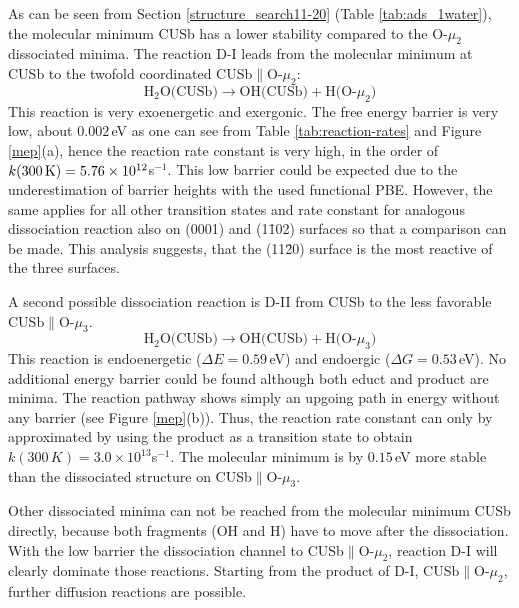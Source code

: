\documentclass[11pt,DIV=13,BCOR=5mm,a4paper,headinclude]{scrbook}
\newcommand\todo[1]{\textcolor{red}{TODO: \textit{{#1}}}}
\begin{document}
As can be seen from Section \ref{structure_search11-20} (Table \ref{tab:ads_1water}), the molecular minimum CUSb has a lower stability compared to the O-$\mu_2$ dissociated minima.
The reaction D-I leads from the molecular minimum at CUSb to the twofold coordinated CUSb$\parallel$O-$\mu_2$:
 \begin{equation}
 \text{H$_2$O(CUSb)} \rightarrow \text{OH(CUSb)} + \text{H(O-$\mu_2$)} \tag{D-I}
      \label{dissI}
\end{equation}
This reaction is very exoenergetic and exergonic.
The free energy barrier is very low, about $0.002\,$eV as one can see from Table \ref{tab:reaction-rates} and Figure \ref{mep}(a), hence the reaction rate constant is very high, in the order of $k(\textrm{300\,K})=5.76\times 10^{12}$s$^{-1}$.
This low barrier could be expected due to the underestimation of barrier heights\cite{Zhao05} with the used functional PBE. %
However, the same applies for all other transition states and rate constant for analogous dissociation reaction also on (0001) and (1\=102) surfaces so that a comparison can be made.
This analysis suggests, that the (11\=20) surface is the most reactive of the three surfaces\cite{WirthJPCC2012,Wirth2016}. %



A second possible dissociation reaction is D-II from CUSb to the less favorable CUSb$\parallel$O-$\mu_3$.
\begin{equation}
  \text{H$_2$O(CUSb)} \rightarrow \text{OH(CUSb)} + \text{H(O-$\mu_3$)} \tag{D-II}
      \label{dissII}
\end{equation}
This reaction is endoenergetic ($\Delta E=0.59\,$eV) and endoergic ($\Delta G=0.53\,$eV).
No additional energy barrier could be found although both educt and product are minima.
The reaction pathway shows simply an upgoing path in energy without any barrier (see Figure \ref{mep}(b)).
Thus, the reaction rate constant can only by approximated by using the product as a transition state to obtain $k(300\,K)=3.0\times 10^{13}$s$^{-1}$.
The molecular minimum is by $0.15\,$eV more stable than the dissociated structure on CUSb$\parallel$O-$\mu_3$.

Other dissociated minima can not be reached from the molecular minimum CUSb directly, because both fragments (OH and H) have to move after the dissociation.
With the low barrier the dissociation channel to CUSb$\parallel$O-$\mu_2$, reaction D-I will clearly dominate those reactions.
Starting from the product of D-I, CUSb$\parallel$O-$\mu_2$, further diffusion reactions are possible.
\end{document}
